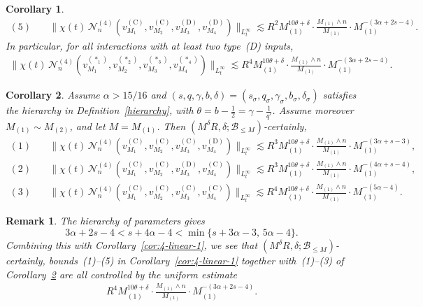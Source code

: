 \documentclass[10pt,a4paper]{amsart}
\newtheorem{corollary}{Corollary}
\newtheorem{remark}{Remark}
\begin{document}
\begin{corollary}
\begin{align*}
		\mathrm{(5)} \quad &
		\|\chi(t)\,\mathcal{N}_n^{(4)}(v^{(\mathrm{C})}_{M_1},v^{(\mathrm{C})}_{M_2},v^{(\mathrm{D})}_{M_3},v^{(\mathrm{D})}_{M_4})\|_{L_t^{\infty}}
		\lesssim
		R^2 M_{(1)}^{10\theta+\delta}\cdot
		\frac{M_{(1)}\wedge n}{M_{(1)}}\cdot M_{(1)}^{-(3\alpha+2s-4)}.
	\end{align*}
	In particular, for all interactions with at least two type~(D) inputs,
	\begin{align}\label{cor:4-linear-1-uniform}
		\|\chi(t)\,\mathcal{N}_n^{(4)}(v^{(\ast_1)}_{M_1},v^{(\ast_2)}_{M_2},v^{(\ast_3)}_{M_3},v^{(\ast_4)}_{M_4})\|_{L_t^{\infty}}
		\lesssim
		R^4 M_{(1)}^{10\theta+\delta}\cdot
		\frac{M_{(1)}\wedge n}{M_{(1)}}\cdot M_{(1)}^{-(3\alpha+2s-4)}.
	\end{align}
\end{corollary}

\begin{corollary}\label{cor:4-linearprob}
	Assume $\alpha>15/16$ and $(s,q,\gamma,b,\delta)=(s_{\sigma},q_{\sigma},\gamma_{\sigma},b_{\sigma},\delta_{\sigma})$ satisfies the hierarchy in Definition~\ref{hierarchy}, with $\theta=b-\frac{1}{2}=\gamma-\frac{1}{q'}$. Assume moreover $M_{(1)}\sim M_{(2)}$, and let $M=M_{(1)}$.
Then $(M^{\delta}R,\delta;\mathcal{B}_{\leq M})$-certainly,
	\begin{align*}
		\mathrm{(1)} \quad &
		\|\chi(t)\,\mathcal{N}_n^{(4)}(v^{(\mathrm{C})}_{M_1},v^{(\mathrm{C})}_{M_2},v^{(\mathrm{C})}_{M_3},v^{(\mathrm{D})}_{M_4})\|_{L_t^{\infty}}
		\lesssim
		R^3 M_{(1)}^{10\theta+\delta}\cdot
		\frac{M_{(1)}\wedge n}{M_{(1)}}\cdot M_{(1)}^{-(3\alpha+s-3)},\\
		\mathrm{(2)} \quad &
		\|\chi(t)\,\mathcal{N}_n^{(4)}(v^{(\mathrm{C})}_{M_1},v^{(\mathrm{C})}_{M_2},v^{(\mathrm{D})}_{M_3},v^{(\mathrm{C})}_{M_4})\|_{L_t^{\infty}}
		\lesssim
		R^3 M_{(1)}^{10\theta+\delta}\cdot
		\frac{M_{(1)}\wedge n}{M_{(1)}}\cdot
		M_{(1)}^{-(4\alpha+s-4)},\\
		\mathrm{(3)}\quad &
		\|\chi(t)\,\mathcal{N}_n^{(4)}(v^{(\mathrm{C})}_{M_1},v^{(\mathrm{C})}_{M_2},v^{(\mathrm{C})}_{M_3},v^{(\mathrm{C})}_{M_4})\|_{L_t^{\infty}}
		\lesssim
		R^4
		M_{(1)}^{10\theta+\delta}\cdot
		\frac{M_{(1)}\wedge n}{M_{(1)}}\cdot
		M_{(1)}^{-(5\alpha-4)}.
	\end{align*}
\end{corollary}

\begin{remark}\label{rmk:numerologyquintic}
	The hierarchy of parameters gives
	\[
	3\alpha+2s-4<s+4\alpha-4< \min\{s+3\alpha-3,\, 5\alpha-4\}.
	\]
	Combining this with Corollary~\ref{cor:4-linear-1}, we see that $(M^{\delta}R,\delta;\mathcal{B}_{\leq M})$-certainly, bounds~(1)--(5) in Corollary~\ref{cor:4-linear-1} together with~(1)--(3) of Corollary~\ref{cor:4-linearprob} are all controlled by the uniform estimate
	\begin{align}\label{finalbd:Nn4}
		R^4 M_{(1)}^{10\theta+\delta}\cdot\frac{M_{(1)}\wedge n}{M_{(1)}}\cdot M_{(1)}^{-(3\alpha+2s-4)}.
	\end{align}
\end{remark}
\end{document}
